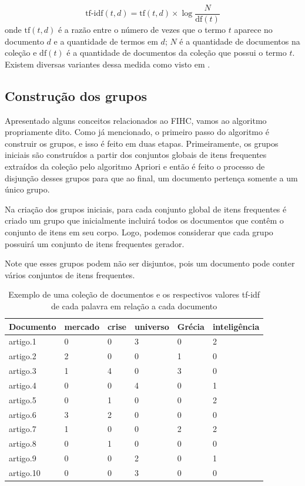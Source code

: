 \documentclass[a4paper,12pt]{article}
\begin{document}
\begin{equation} \mbox{tf-idf}(t, d) = \mbox{tf}(t, d) \times \log \frac{N} {\mbox{df}(t)} \end{equation}
onde $\mbox{tf}(t,d)$ é a razão entre o número de vezes que o termo $t$ aparece no documento $d$ e a quantidade de termos em $d$; $N$ é a quantidade de documentos na coleção e $\mbox{df}(t)$ é a quantidade de documentos da coleção que possui o termo $t$. Existem diversas variantes dessa medida como visto em \cite{Manning09}.

\subsection {Construção dos grupos}
\label {sec:construcao_grupos}

Apresentado alguns conceitos relacionados ao FIHC, vamos ao algoritmo propriamente dito. Como já mencionado, o primeiro passo do algoritmo é construir os grupos, e isso é feito em duas etapas. Primeiramente, os grupos iniciais são construídos a partir dos conjuntos globais de itens frequentes extraídos da coleção pelo algoritmo Apriori e então é feito o processo de disjunção desses grupos para que ao final, um documento pertença somente a um único grupo.

Na criação dos grupos iniciais, para cada conjunto global de itens frequentes é criado um grupo que inicialmente incluirá todos os documentos que contêm o conjunto de itens em seu corpo. Logo, podemos considerar que cada grupo possuirá um conjunto de itens frequentes gerador. 

Note que esses grupos podem não ser disjuntos, pois um documento pode conter vários conjuntos de itens frequentes.

\begin{table}[h]
\centering
\begin{tabular}{ | l | l | l | l | l | l | }
\hline
Documento & mercado & crise & universo & Grécia & inteligência \\ \hline
artigo.1     & 0 & 0 & 3 & 0 & 2 \\ \hline
artigo.2     & 2 & 0 & 0 & 1 & 0 \\ \hline
artigo.3     & 1 & 4 & 0 & 3 & 0 \\ \hline
artigo.4     & 0 & 0 & 4 & 0 & 1 \\ \hline
artigo.5     & 0 & 1 & 0 & 0 & 2 \\ \hline
artigo.6     & 3 & 2 & 0 & 0 & 0 \\ \hline
artigo.7     & 1 & 0 & 0 & 2 & 2 \\ \hline
artigo.8     & 0 & 1 & 0 & 0 & 0 \\ \hline
artigo.9     & 0 & 0 & 2 & 0 & 1 \\ \hline
artigo.10   & 0 & 0 & 3 & 0 & 0 \\
\hline
\end{tabular}
\caption{Exemplo de uma coleção de documentos e os respectivos valores tf-idf de cada palavra em relação a cada documento}
\label{table:exemplo_docs}
\end{table}
\end{document}
